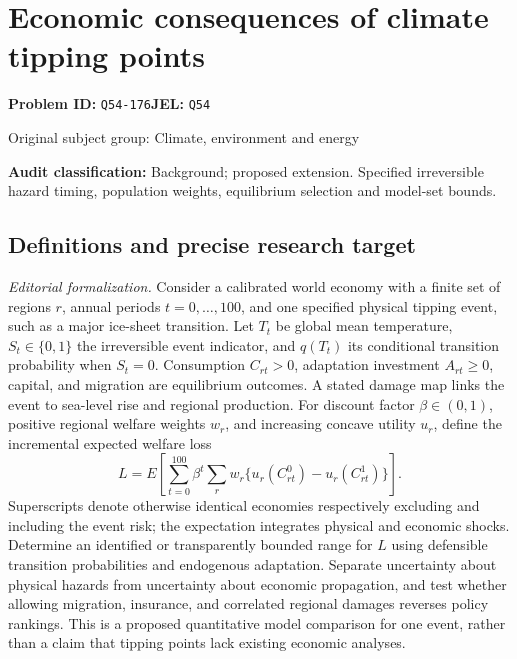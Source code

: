 \documentclass[11pt,a4paper]{article}
\begin{document}
\section*{Economic consequences of climate tipping points}
\textbf{Problem ID:} \texttt{Q54-176}\quad \textbf{JEL:} \texttt{Q54}\par
\label{problem:OP-0431}
{\sffamily\small\color{muted}Original subject group: Climate, environment and energy\par}
\label{definitions:problem:30007713}
\textbf{Audit classification:} Background; proposed extension. Specified irreversible hazard timing, population weights, equilibrium selection and model-set bounds.
\subsection*{Definitions and precise research target}
\textit{Editorial formalization.} Consider a calibrated world economy with a finite set of regions \(r\), annual periods \(t=0,\ldots,100\), and one specified physical tipping event, such as a major ice-sheet transition. Let \(T_t\) be global mean temperature, \(S_t\in\{0,1\}\) the irreversible event indicator, and \(q(T_t)\) its conditional transition probability when \(S_t=0\). Consumption \(C_{rt}>0\), adaptation investment \(A_{rt}\geq0\), capital, and migration are equilibrium outcomes. A stated damage map links the event to sea-level rise and regional production. For discount factor \(\beta\in(0,1)\), positive regional welfare weights \(w_r\), and increasing concave utility \(u_r\), define the incremental expected welfare loss
\[L=E\!\left[\sum_{t=0}^{100}\beta^t\sum_r w_r\{u_r(C_{rt}^{0})-u_r(C_{rt}^{1})\}\right].\]
Superscripts denote otherwise identical economies respectively excluding and including the event risk; the expectation integrates physical and economic shocks. Determine an identified or transparently bounded range for \(L\) using defensible transition probabilities and endogenous adaptation. Separate uncertainty about physical hazards from uncertainty about economic propagation, and test whether allowing migration, insurance, and correlated regional damages reverses policy rankings. This is a proposed quantitative model comparison for one event, rather than a claim that tipping points lack existing economic analyses.
\end{document}
